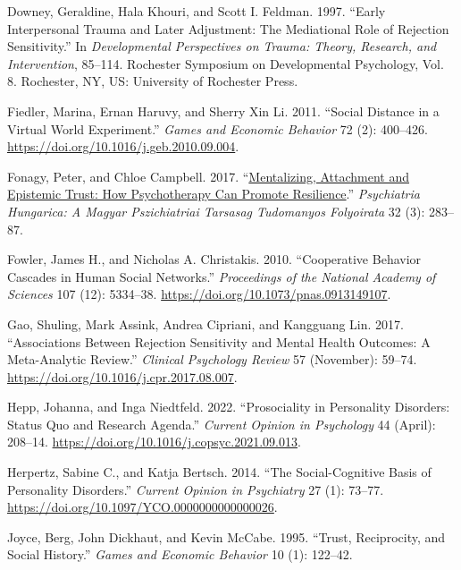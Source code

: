\documentclass[
]{article}
\newlength{\cslhangindent}
\newenvironment{CSLReferences}[2] %
 {\begin{list}{}{%
  \setlength{\itemindent}{0pt}
  \setlength{\leftmargin}{0pt}
  \setlength{\parsep}{0pt}
  \ifodd #1
   \setlength{\leftmargin}{\cslhangindent}
   \setlength{\itemindent}{-1\cslhangindent}
  \fi
  \setlength{\itemsep}{#2\baselineskip}}}
 {\end{list}}
\begin{document}
\begin{CSLReferences}{1}{0}
Downey, Geraldine, Hala Khouri, and Scott I. Feldman. 1997. {``Early Interpersonal Trauma and Later Adjustment: {The} Mediational Role of Rejection Sensitivity.''} In \emph{Developmental Perspectives on Trauma: {Theory}, Research, and Intervention}, 85--114. Rochester Symposium on Developmental Psychology, {Vol}. 8. Rochester, NY, US: University of Rochester Press.

Fiedler, Marina, Ernan Haruvy, and Sherry Xin Li. 2011. {``Social Distance in a Virtual World Experiment.''} \emph{Games and Economic Behavior} 72 (2): 400--426. \url{https://doi.org/10.1016/j.geb.2010.09.004}.

Fonagy, Peter, and Chloe Campbell. 2017. {``\href{https://www.ncbi.nlm.nih.gov/pubmed/29135441}{Mentalizing, Attachment and Epistemic Trust: How Psychotherapy Can Promote Resilience}.''} \emph{Psychiatria Hungarica: A Magyar Pszichiatriai Tarsasag Tudomanyos Folyoirata} 32 (3): 283--87.

Fowler, James H., and Nicholas A. Christakis. 2010. {``Cooperative Behavior Cascades in Human Social Networks.''} \emph{Proceedings of the National Academy of Sciences} 107 (12): 5334--38. \url{https://doi.org/10.1073/pnas.0913149107}.

Gao, Shuling, Mark Assink, Andrea Cipriani, and Kangguang Lin. 2017. {``Associations Between Rejection Sensitivity and Mental Health Outcomes: {A} Meta-Analytic Review.''} \emph{Clinical Psychology Review} 57 (November): 59--74. \url{https://doi.org/10.1016/j.cpr.2017.08.007}.

Hepp, Johanna, and Inga Niedtfeld. 2022. {``Prosociality in Personality Disorders: {Status} Quo and Research Agenda.''} \emph{Current Opinion in Psychology} 44 (April): 208--14. \url{https://doi.org/10.1016/j.copsyc.2021.09.013}.

Herpertz, Sabine C., and Katja Bertsch. 2014. {``The Social-Cognitive Basis of Personality Disorders.''} \emph{Current Opinion in Psychiatry} 27 (1): 73--77. \url{https://doi.org/10.1097/YCO.0000000000000026}.

Joyce, Berg, John Dickhaut, and Kevin McCabe. 1995. {``Trust, {Reciprocity}, and {Social History}.''} \emph{Games and Economic Behavior} 10 (1): 122--42.


\end{CSLReferences}
\end{document}
